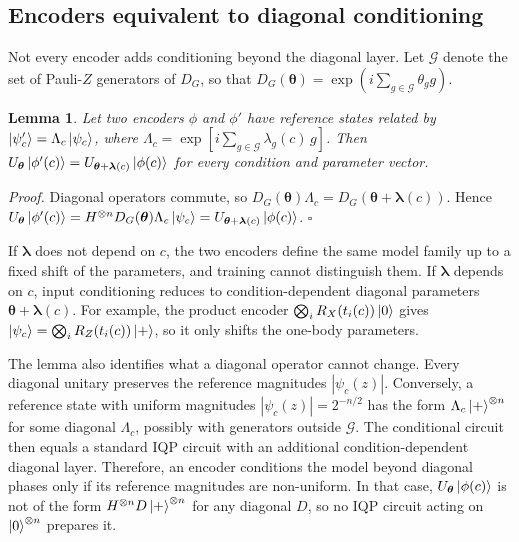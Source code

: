 \documentclass[pra,aps,10pt,twocolumn,floatfix,superscriptaddress, notitlepage,longbibliography]{revtex4-2}
\newtheorem{lemma}{Lemma}
\begin{document}
\subsection{Encoders equivalent to diagonal conditioning}
\label{sec:gauge}

Not every encoder adds conditioning beyond the diagonal layer. Let $\mathcal G$ denote the set of Pauli-$Z$ generators of $D_G$, so that $D_G(\boldsymbol\theta)=\exp(i\sum_{g\in\mathcal G}\theta_g g)$.

\begin{lemma}
\label{lem:gauge}
Let two encoders $\phi$ and $\phi'$ have reference states related by $\ket{\psi'_c}=\Lambda_c\ket{\psi_c}$, where $\Lambda_c=\exp[i\sum_{g\in\mathcal G}\lambda_g(c)\,g]$. Then $U_{\boldsymbol\theta}\ket{\phi'(c)}=U_{\boldsymbol\theta+\boldsymbol\lambda(c)}\ket{\phi(c)}$ for every condition and parameter vector.
\end{lemma}

\textit{Proof.} Diagonal operators commute, so $D_G(\boldsymbol\theta)\Lambda_c=D_G(\boldsymbol\theta+\boldsymbol\lambda(c))$. Hence $U_{\boldsymbol\theta}\ket{\phi'(c)}=H^{\otimes n}D_G(\boldsymbol\theta)\Lambda_c\ket{\psi_c}=U_{\boldsymbol\theta+\boldsymbol\lambda(c)}\ket{\phi(c)}$. $\square$

If $\boldsymbol\lambda$ does not depend on $c$, the two encoders define the same model family up to a fixed shift of the parameters, and training cannot distinguish them. If $\boldsymbol\lambda$ depends on $c$, input conditioning reduces to condition-dependent diagonal parameters $\boldsymbol\theta+\boldsymbol\lambda(c)$. For example, the product encoder $\bigotimes_i R_X(t_i(c))\ket{0}$ gives $\ket{\psi_c}=\bigotimes_i R_Z(t_i(c))\ket{+}$, so it only shifts the one-body parameters.

The lemma also identifies what a diagonal operator cannot change. Every diagonal unitary preserves the reference magnitudes $|\psi_c(z)|$. Conversely, a reference state with uniform magnitudes $|\psi_c(z)|=2^{-n/2}$ has the form $\Lambda_c\ket{+}^{\otimes n}$ for some diagonal $\Lambda_c$, possibly with generators outside $\mathcal G$. The conditional circuit then equals a standard IQP circuit with an additional condition-dependent diagonal layer. Therefore, an encoder conditions the model beyond diagonal phases only if its reference magnitudes are non-uniform. In that case, $U_{\boldsymbol\theta}\ket{\phi(c)}$ is not of the form $H^{\otimes n}D\ket{+}^{\otimes n}$ for any diagonal $D$, so no IQP circuit acting on $\ket{0}^{\otimes n}$ prepares it.
\end{document}
